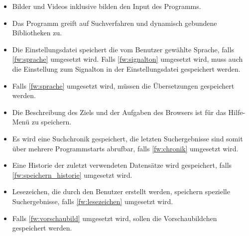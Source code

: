 \begin{itemize}
	\item Bilder und Videos inklusive  bilden den Input des Programms.
	\item Das Programm greift auf \gls{Suchverfahren} und dynamisch gebundene Bibliotheken zu.
	\item Die Einstellungsdatei speichert die vom Benutzer gewählte Sprache, falls \ref{fw:sprache} umgesetzt wird. Falls \ref{fw:signalton} umgesetzt wird, muss auch die Einstellung zum Signalton in der Einstellungsdatei gespeichert werden.
	\item Falls \ref{fw:sprache} umgesetzt wird, müssen die Übersetzungen gespeichert werden.
	\item Die Beschreibung des Ziels und der Aufgaben des Browsers ist für das Hilfe-Menü zu speichern.
	\item Es wird eine \gls{Suchchronik} gespeichert, die letzten Suchergebnisse sind somit über mehrere Programmstarts abrufbar, falls \ref{fw:chronik} umgesetzt wird. 
	\item Eine Historie der zuletzt verwendeten Datensätze wird gespeichert, falls \ref{fw:speichern_historie} umgesetzt wird.
	\item \gls{Lesezeichen}, die durch den Benutzer erstellt werden, speichern spezielle Suchergebnisse, falls \ref{fw:lesezeichen} umgesetzt wird.
	\item Falls \ref{fw:vorschaubild} umgesetzt wird, sollen die Vorschaubildchen gespeichert werden.
\end{itemize}
\pagebreak
